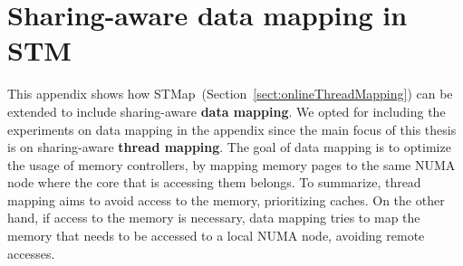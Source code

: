 \chapter{Sharing-aware data mapping in STM}\label{chap:sharAwareDataMap}

This appendix shows how STMap~(Section~\ref{sect:onlineThreadMapping}) can be extended to include sharing-aware \textbf{data mapping}. We opted for including the experiments on data mapping in the appendix since the main focus of this thesis is on sharing-aware \textbf{thread mapping}. The goal of data mapping is to optimize the usage of memory controllers, by mapping memory pages to the same NUMA node where the core that is accessing them belongs. To summarize, thread mapping aims to avoid access to the memory, prioritizing caches. On the other hand, if access to the memory is necessary, data mapping tries to map the memory that needs to be accessed to a local NUMA node, avoiding remote accesses.

